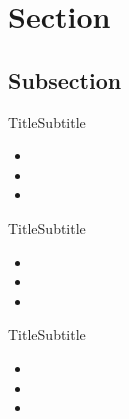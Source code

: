 \section{Section}

\subsection{Subsection}

\begin{frame}{Title}{Subtitle}
    \begin{itemize}
        \item 
        \item 
        \item 
    \end{itemize}
\end{frame}
\note{
}

\begin{frame}{Title}{Subtitle}
    \begin{itemize}
        \item 
        \item 
        \item 
    \end{itemize}
\end{frame}
\note{
}

\begin{frame}{Title}{Subtitle}
    \begin{itemize}
        \item 
        \item 
        \item 
    \end{itemize}
\end{frame}
\note{
}

